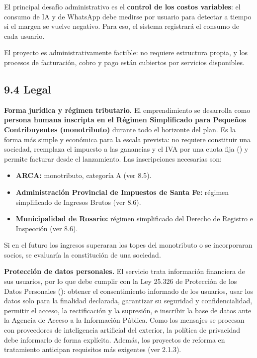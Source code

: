 El principal desafío administrativo es el \textbf{control de los costos
variables}: el consumo de IA y de WhatsApp debe medirse por usuario para
detectar a tiempo si el margen se vuelve negativo. Para eso, el sistema
registrará el consumo de cada usuario.

El proyecto es administrativamente factible: no requiere estructura
propia, y los procesos de facturación, cobro y pago están cubiertos por
servicios disponibles.

\subsection*{9.4 Legal}\label{legal}

\textbf{Forma jurídica y régimen tributario.} El emprendimiento se
desarrolla como \textbf{persona humana inscripta en el Régimen
Simplificado para Pequeños Contribuyentes (monotributo)} durante todo el
horizonte del plan. Es la forma más simple y económica para la escala
prevista: no requiere constituir una sociedad, reemplaza el impuesto a
las ganancias y el IVA por una cuota fija () y permite facturar desde el lanzamiento. Las
inscripciones necesarias son:

\begin{itemize}
\tightlist
\item
  \textbf{ARCA:} monotributo, categoría A (ver 8.5).
\item
  \textbf{Administración Provincial de Impuestos de Santa Fe:} régimen
  simplificado de Ingresos Brutos (ver 8.6).
\item
  \textbf{Municipalidad de Rosario:} régimen simplificado del Derecho de
  Registro e Inspección (ver 8.6).
\end{itemize}

Si en el futuro los ingresos superaran los topes del monotributo o se
incorporaran socios, se evaluaría la constitución de una sociedad.

\textbf{Protección de datos personales.} El servicio trata información
financiera de sus usuarios, por lo que debe cumplir con la Ley 25.326 de
Protección de los Datos Personales (): obtener el consentimiento
informado de los usuarios, usar los datos solo para la finalidad
declarada, garantizar su seguridad y confidencialidad, permitir el
acceso, la rectificación y la supresión, e inscribir la base de datos
ante la Agencia de Acceso a la Información Pública. Como los mensajes se
procesan con proveedores de inteligencia artificial del exterior, la
política de privacidad debe informarlo de forma explícita. Además, los
proyectos de reforma en tratamiento anticipan requisitos más exigentes
(ver 2.1.3).

